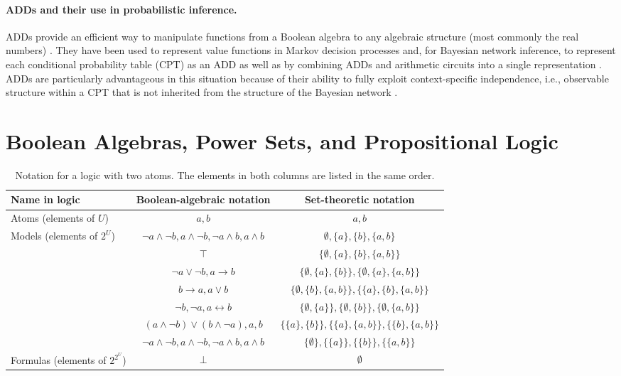 \documentclass[letterpaper]{article} %
\theoremstyle{definition}
\theoremstyle{remark}
\begin{document}
\paragraph{ADDs and their use in probabilistic inference.} ADDs provide an
efficient way to manipulate functions from a Boolean algebra to any algebraic
structure (most commonly the real numbers)
\cite{DBLP:journals/fmsd/BaharFGHMPS97}. They have been used to represent value
functions in Markov decision processes \cite{DBLP:conf/uai/HoeySHB99} and, for
Bayesian network inference, to represent each conditional probability table
(CPT) as an ADD \cite{DBLP:conf/icml/ZhaoMP15} as well as by combining ADDs and
arithmetic circuits into a  single representation
\cite{DBLP:conf/ijcai/ChaviraD07}. ADDs are particularly advantageous in this
situation because of their ability to fully exploit context-specific
independence, i.e., observable structure within a CPT that is not inherited from
the structure of the Bayesian network \cite{DBLP:conf/uai/BoutilierFGK96}.

\section{Boolean Algebras, Power Sets, and Propositional
  Logic} \label{sec:prelims}

\begin{table*}
  \caption{Notation for a logic with two atoms. The elements in both columns are
    listed in the same order.}
  \label{tbl:notation_example}
  \centering
  \begin{tabular}{lcc}
    \toprule
    Name in logic & Boolean-algebraic notation & Set-theoretic notation \\
    \midrule
    Atoms (elements of $U$) & $a, b$ & $a, b$ \\
    \rowcolor{gray!10} Models (elements of $2^U$) & $\neg a \land \neg b, a \land \neg b, \neg a \land b, a \land b$ & $\emptyset, \{a\}, \{b\}, \{a, b\}$ \\
    & $\top$ & $\{ \emptyset, \{a\}, \{b\}, \{a, b\} \}$ \\
    & $\neg a \lor \neg b, a \to b$ & $\{ \emptyset, \{a\}, \{b\} \}, \{ \emptyset, \{a\}, \{a, b\} \}$ \\
    & $b \to a, a \lor b$ & $\{ \emptyset, \{b\}, \{a, b\} \}, \{ \{a\}, \{b\}, \{a, b\} \}$ \\
    & $\neg b, \neg a, a \leftrightarrow b$ & $\{\emptyset, \{a\}\}, \{\emptyset, \{b\}\}, \{\emptyset, \{a, b\}\}$ \\
    & $(a \land \neg b) \lor (b \land \neg a), a, b$ & $\{\{a\}, \{b\}\}, \{\{a\}, \{a, b\}\}, \{\{b\}, \{a, b\}\}$ \\
    & $\neg a \land \neg b, a \land \neg b, \neg a \land b, a \land b$ & $\{\emptyset\}, \{\{a\}\}, \{\{b\}\}, \{\{a, b\}\}$ \\
    \multirow{-7}{*}{Formulas (elements of $2^{2^U}$)} & $\bot$ & $\emptyset$ \\
    \bottomrule
  \end{tabular}
\end{table*}
\end{document}
